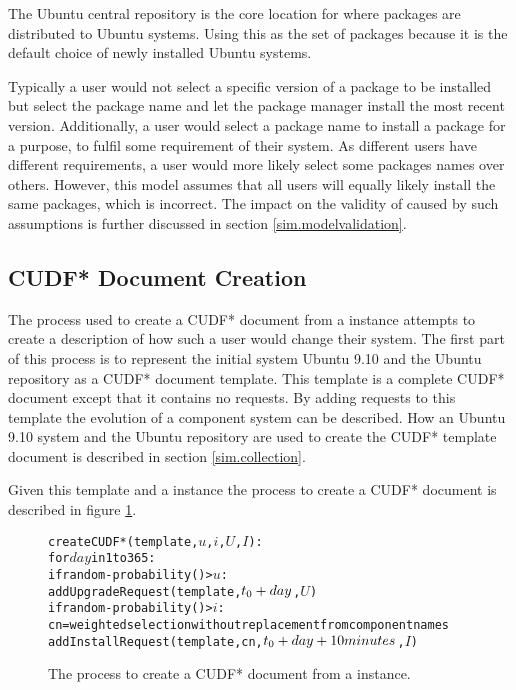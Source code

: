 The Ubuntu central repository is the core location for where packages are distributed to Ubuntu systems.
Using this as the set of packages because it is the default choice of newly installed Ubuntu systems.

Typically a user would not select a specific version of a package to be installed but select the package name and let the package manager install the most recent version.
Additionally, a user would select a package name to install a package for a purpose, to fulfil some requirement of their system.
As different users have different requirements, a user would more likely select some packages names over others.
However, this model assumes that all users will equally likely install the same packages, which is incorrect.
The impact on the validity of \usermodel caused by such assumptions is further discussed in section \ref{sim.modelvalidation}.

\subsection{CUDF* Document Creation}
The process used to create a CUDF* document from a \usermodel instance attempts to create a description of how such a user would change their system.
The first part of this process is to represent the initial system Ubuntu 9.10 and the Ubuntu repository as a CUDF* document template.
This template is a complete CUDF* document except that it contains no requests.
By adding requests to this template the evolution of a component system can be described.
How an Ubuntu 9.10 system and the Ubuntu repository are used to create the CUDF* template document is described in section \ref{sim.collection}.

Given this template and a \usermodel instance the process to create a CUDF* document is described in figure \ref{sim.CUDF*}.
\begin{figure}[h]
\begin{center}
\begin{alltt}
createCUDF*(template, \( u\), \( i\), \( U\), \( I\)):
 for \(day\) in 1 to 365:
  if random-probability() > \( u\):
    addUpgradeRequest(template,\(t\sb{0}+day\),\(U\))
  if random-probability() > \( i\):  
   cn = weighted selection without replacement from component names  
   addInstallRequest(template, cn, \(t\sb{0}+day+10 minutes\),\(I\))
\end{alltt}
  \caption{The process to create a CUDF* document from a \usermodel instance.}
  \label{sim.CUDF*}
\end{center}
\end{figure}


